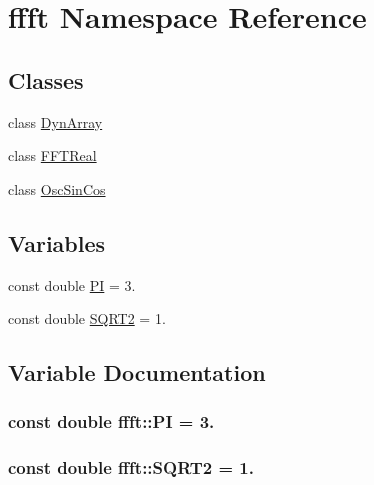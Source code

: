 \hypertarget{namespaceffft}{}\section{ffft Namespace Reference}
\label{namespaceffft}
\subsection*{Classes}
\begin{DoxyCompactItemize}
\item 
class \hyperlink{classffft_1_1DynArray}{Dyn\+Array}
\item 
class \hyperlink{classffft_1_1FFTReal}{F\+F\+T\+Real}
\item 
class \hyperlink{classffft_1_1OscSinCos}{Osc\+Sin\+Cos}
\end{DoxyCompactItemize}
\subsection*{Variables}
\begin{DoxyCompactItemize}
\item 
const double \hyperlink{namespaceffft_a74ffcd4c90202b5240bbca7374dfd6fa}{PI} = 3.
\item 
const double \hyperlink{namespaceffft_a489004390ad7d791bf53a724c0f07abb}{S\+Q\+R\+T2} = 1.
\end{DoxyCompactItemize}


\subsection{Variable Documentation}
\subsubsection[{\texorpdfstring{PI}{PI}}]{\setlength{\rightskip}{0pt plus 5cm}const double ffft\+::\+PI = 3.}\hypertarget{namespaceffft_a74ffcd4c90202b5240bbca7374dfd6fa}{}\label{namespaceffft_a74ffcd4c90202b5240bbca7374dfd6fa}
\subsubsection[{\texorpdfstring{S\+Q\+R\+T2}{SQRT2}}]{\setlength{\rightskip}{0pt plus 5cm}const double ffft\+::\+S\+Q\+R\+T2 = 1.}\hypertarget{namespaceffft_a489004390ad7d791bf53a724c0f07abb}{}\label{namespaceffft_a489004390ad7d791bf53a724c0f07abb}
